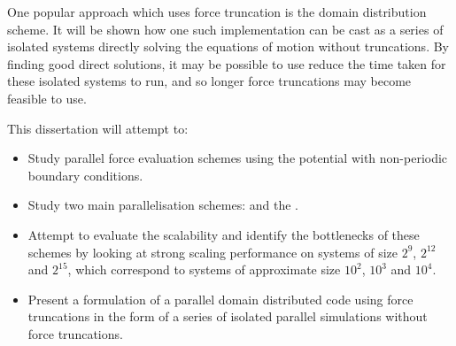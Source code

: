 %
One popular approach which uses force truncation is the
domain distribution scheme.
It will be shown how one such implementation can be cast as
a series of isolated systems
directly solving the equations of motion without truncations.
%
By finding good direct solutions, it may be possible to use reduce the
time taken for these isolated systems to run, and so longer
force truncations may become feasible to use.


%
This dissertation will attempt to:
\begin{itemize}
\item
    Study parallel force evaluation schemes using
    the \twobody{} \LennardJones{} potential with
    non-periodic boundary conditions.

\item
    Study two main parallelisation schemes:
    \replicateddata{} and the \systolicloop{}.

\item
    Attempt to evaluate the scalability and
    identify the bottlenecks of these schemes
    by looking at strong scaling performance
    on systems of size
    $2^{9}$, $2^{12}$ and $2^{15}$, which correspond
    to systems of approximate size $10^2$, $10^3$ and $10^4$.

\item
    Present a formulation of a parallel domain distributed code using
    force truncations in the form of
    a series of isolated parallel simulations
    without force truncations.
\end  {itemize}

